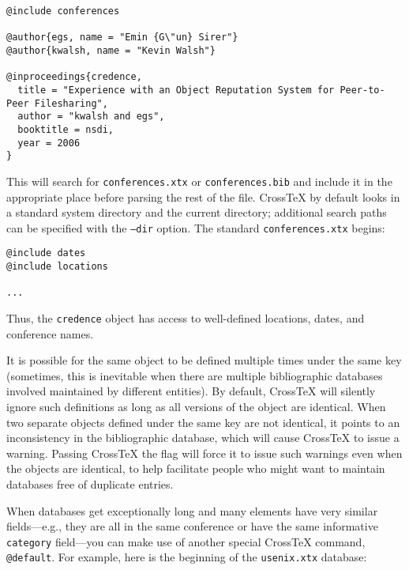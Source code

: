 \documentclass{article}
\newcommand{\XTeX}{Cross\TeX}
\begin{document}
\begin{small}\begin{verbatim}
@include conferences

@author{egs, name = "Emin {G\"un} Sirer"}
@author{kwalsh, name = "Kevin Walsh"}

@inproceedings{credence,
  title = "Experience with an Object Reputation System for Peer-to-Peer Filesharing",
  author = "kwalsh and egs",
  booktitle = nsdi,
  year = 2006
}
\end{verbatim}\end{small}

This will search for \texttt{conferences.xtx} or \texttt{conferences.bib} and include it in the appropriate place before parsing the rest of the file. \XTeX{} by default looks in a standard system directory and the current directory; additional search paths can be specified with the \texttt{--dir} option. The standard \texttt{conferences.xtx} begins:

\begin{small}\begin{verbatim}
@include dates
@include locations

...
\end{verbatim}\end{small}

Thus, the \texttt{credence} object has access to well-defined locations, dates, and conference names.

It is possible for the same object to be defined multiple times under the 
same key (sometimes, this is inevitable when there are multiple bibliographic
databases involved maintained by different entities). By default, \XTeX{}
will silently ignore such definitions as long as all versions of the object
are identical. When two separate objects defined under the same key are not
identical, it points to an inconsistency in the bibliographic database, which
will cause \XTeX{} to issue a warning. Passing \XTeX{} the  flag will force it to issue such warnings even when the objects are identical,
to help facilitate people who might want to maintain databases free of
duplicate entries.

When databases get exceptionally long and many elements have very similar fields---e.g., they are all in the same conference or have the same informative \texttt{category} field---you can make use of another special \XTeX{} command, \texttt{@default}. For example, here is the beginning of the \texttt{usenix.xtx} database:
\end{document}
